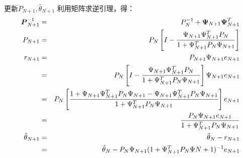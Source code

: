 \bgroup
{}
\begin{frame}{更新$P_{N+1},\hat\theta_{N+1}$}
利用矩阵求逆引理，得：
\begin{eqnarray*}
\boldsymbol{P}_{N+1}^{-1} &=& P_N^{-1}+\boldsymbol{\Psi}_{N+1}\boldsymbol{\Psi}_{N+1}^T  \\
P_{N+1}&=& P_N\left[I-\frac{\Psi_{N+1}\Psi_{N+1}^T P_N}{1+\Psi_{N+1}^T P_N \Psi_{N+1}}\right] \\
r_{N+1}&=&P_{N+1}\Psi_{N+1}e_{N+1} \\
&=&P_N\left[I-\frac{\Psi_{N+1}\Psi_{N+1}^T P_N}{1+\Psi_{N+1}^T P_N\Psi_{N+1}}\right]\Psi_{N+1}e_{N+1} \\
&=&P_N\left[\frac{1+\Psi_{N+1}\Psi_{N+1}^T P_N\Psi_{N+1}-\Psi_{N+1}\Psi_{N+1}^T P_N \Psi_{N+1}}{1+\Psi_{N+1}^T P_N\Psi_{N+1}}\right]e_{N+1} \\
&=&\frac{P_N\Psi_{N+1}e_{N+1}}{1+\Psi_{N+1}^T P_N \Psi_{N+1}} \\
\hat\theta_{N+1}&=&\hat\theta_N-r_{N+1}\\
&=&\hat\theta_N-P_N\Psi_{N+1}(1+\Psi_{N+1}^T P_N \Psi{N+1})^{-1}e_{N+1}
\end{eqnarray*}
\end{frame}
\egroup

